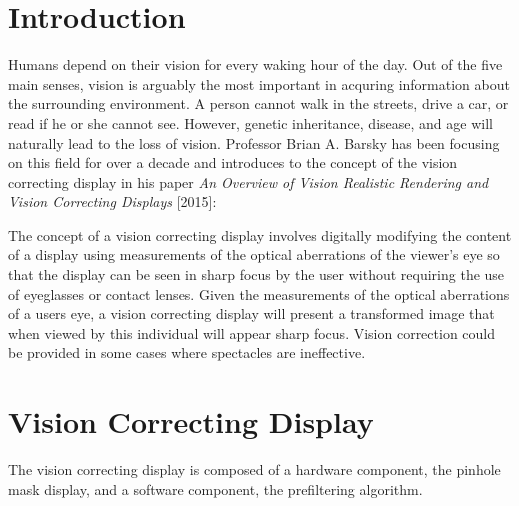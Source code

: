 \documentclass{acmsiggraph}
\begin{document}

%
%


\keywordlist

\conceptlist

\printcopyright

\section{Introduction}

\noindent 
Humans depend on their vision for every waking hour of the day. Out of the five main senses, vision is arguably the most important in acquring information about the surrounding environment. A person cannot walk in the streets, drive a car, or read if he or she cannot see. However, genetic inheritance, disease, and age will naturally lead to the loss of vision. Professor Brian A. Barsky has been focusing on this field for over a decade and introduces to the concept of the vision correcting display in his paper \textit{An Overview of Vision Realistic Rendering and Vision Correcting Displays} [2015]:

\begin{displayquote}
The concept of a vision correcting display involves digitally modifying the content of a display using measurements of the optical aberrations of the viewer's eye so that the display can be seen in sharp focus by the user without requiring the use of eyeglasses or contact lenses. Given the measurements of the optical aberrations of a users eye, a vision correcting display will present a transformed image that when viewed by this individual will appear sharp focus. Vision correction could be provided in some cases where spectacles are ineffective.
\end{displayquote}

\section{Vision Correcting Display}

The vision correcting display is composed of a hardware component, the pinhole mask display, and a software component, the prefiltering algorithm.
\end{document}
